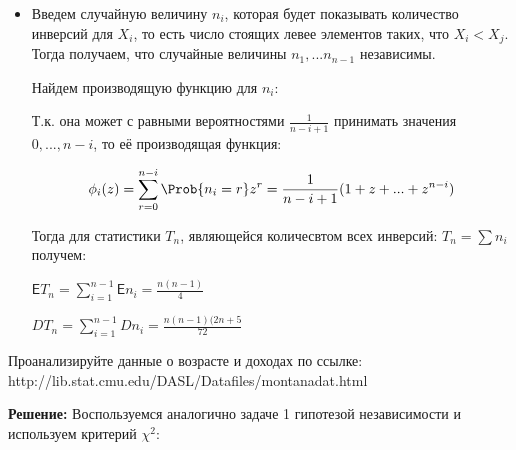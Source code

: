 \documentclass[12pt]{article}
\theoremstyle{definiton}
\theoremstyle{definition}
\theoremstyle{definition}
\newcommand{\Expect}{\mathsf{E}}
\newcounter{problem}
\newcounter{subproblem}
\def\prp{\medskip\noindent\stepcounter{problem}{\bf Задача \theproblem .  }\setcounter{subproblem}{0} }
\begin{document}
\begin{itemize}

\item Введем случайную величину $n_i$, которая будет показывать количество инверсий для $X_i$, то есть число стоящих левее элементов таких, что $X_i < X_j$. Тогда получаем, что случайные величины $n_1,...n_{n-1}$ независимы.

Найдем производящую функцию для $n_i$:

Т.к. она может с равными вероятностями $\frac{1}{n-i+1}$ принимать значения $0,...,n-i$, то её производящая функция:

$$\phi_i(z) = \sum\limits_{r=0}^{n-i} \Prob{n_i = r} z^r = \frac{1}{n-i+1}(1+z+... + z^{n-i})$$

Тогда для статистики $T_n$, являющейся количесвтом всех инверсий: $T_n = \sum n_i$ получем:

$\Expect{T_n} = \sum\limits_{i=1}^{n-1} \Expect{n_i} = \frac{n(n-1)}{4}$

$DT_n = \sum\limits_{i=1}^{n-1} Dn_i = \frac{n(n-1)(2n+5}{72}$


\end{itemize}

\prp Проанализируйте данные о возрасте и доходах по ссылке:
http://lib.stat.cmu.edu/DASL/Datafiles/montanadat.html

\textbf{Решение: } Воспользуемся аналогично задаче 1 гипотезой независимости и используем критерий $\chi^2$:
\end{document}
